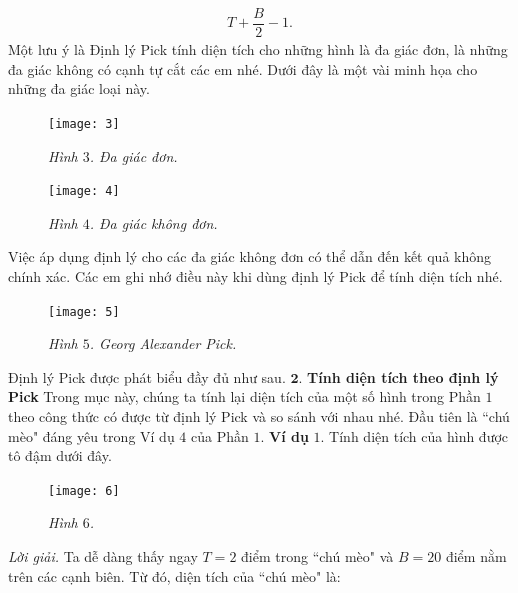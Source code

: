 \begin{multicols}{2}
	\begin{align*}
		T+  \dfrac{B}{2}-1.
	\end{align*}
	Một lưu ý là Định lý Pick tính diện tích cho những hình là đa giác đơn, là những đa giác không có cạnh tự cắt các em nhé. Dưới đây là một vài minh họa cho những đa giác loại này.
	\begin{figure}[H]
		\vspace*{-5pt}
		\centering
		\captionsetup{labelformat= empty, justification=centering}
		\texttt{[image: 3]}
		\caption{\small\textit{\color{toancuabi}Hình $3$. Đa giác đơn.}}
		\vspace*{-5pt}
	\end{figure}
	\begin{figure}[H]
		\vspace*{5pt}
		\centering
		\captionsetup{labelformat= empty, justification=centering}
		\texttt{[image: 4]}
		\caption{\small\textit{\color{toancuabi}Hình $4$. Đa giác không đơn.}}
		\vspace*{-10pt}
	\end{figure}
	Việc áp dụng định lý cho các đa giác không đơn có thể dẫn đến kết quả không chính xác. Các em ghi nhớ điều này khi dùng định lý Pick để tính diện tích nhé.
	\begin{figure}[H]
		\vspace*{-5pt}
		\centering
		\captionsetup{labelformat= empty, justification=centering}
		\texttt{[image: 5]}
		\caption{\small\textit{\color{toancuabi}Hình $5$. Georg Alexander Pick.}}
		\vspace*{-10pt}
	\end{figure}
	Định lý Pick được phát biểu đầy đủ như sau.
	\vskip 0.1cm
	$\pmb{2.}$ \textbf{\color{toancuabi}Tính diện tích theo định lý Pick}
	\vskip 0.1cm
	Trong mục này, chúng ta tính lại diện tích của một số hình trong Phần $1$ theo công thức có được từ định lý Pick và so sánh với nhau nhé.
	Đầu tiên là ``chú mèo" đáng yêu trong Ví dụ $4$ của Phần $1$.
	\vskip 0.1cm
	\textbf{\color{toancuabi}Ví dụ} $1$. Tính diện tích của hình được tô đậm dưới đây.
	\begin{figure}[H]
		\vspace*{-5pt}
		\centering
		\captionsetup{labelformat= empty, justification=centering}
		\texttt{[image: 6]}
		\caption{\small\textit{\color{toancuabi}Hình $6$.}}
		\vspace*{-10pt}
	\end{figure}
	\textit{Lời giải.} Ta dễ dàng thấy ngay $T = 2$ điểm trong ``chú mèo" và $B = 20$ điểm nằm trên các cạnh biên. Từ đó, diện tích của ``chú mèo" là:

\end{multicols}
